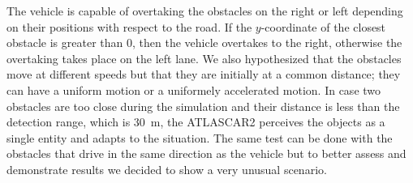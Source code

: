 \documentclass[conference,11pt]{IEEEtran}
\begin{document}
The vehicle is capable of overtaking the obstacles on the right or left depending on their positions with respect to the road. If the $y$-coordinate of the closest obstacle is greater than 0, then the vehicle overtakes to the right, otherwise the overtaking takes place on the left lane. We also hypothesized that the obstacles move at different speeds but that they are initially at a common distance; they can have a uniform motion or a uniformely accelerated motion. In case two obstacles are too close during the simulation and their distance is less than the detection range, which is \SI{30}{m}, the ATLASCAR2 perceives the objects as a single entity and adapts to the situation. The same test can be done with the obstacles that drive in the same direction as the vehicle but to better assess and demonstrate results we decided to show a very unusual scenario.
\end{document}
